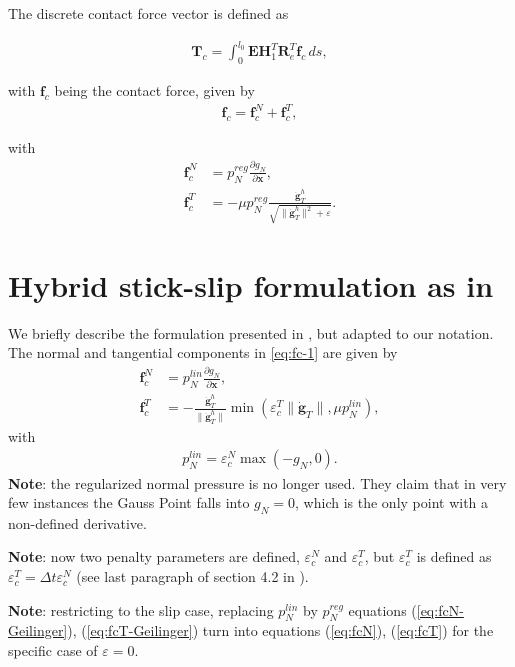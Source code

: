 \documentclass[3p]{elsarticle}
\newcommand{\vect}[1]{\boldsymbol{#1}}
\begin{document}
The discrete contact force vector is defined as

\begin{align}
	\vect{T}_c = \int_0^{l_0}\vect{E}\vect{H}^T_1\vect{R}_e^T\vect{f}_c\,ds,\label{eq:Tc}
\end{align}


\noindent  with $\vect{f}_c$ being the contact force, given by
\begin{align}
	\vect{f}_c = \vect{f}_c^N + \vect{f}_c^T\label{eq:fc-1},
\end{align}

\noindent with
\begin{align}
	\vect{f}_c^N &= p_N^{reg}\frac{\partial g_N}{\partial\vect{x}},\label{eq:fcN}\\
	\vect{f}_c^T&=-\mu p_N^{reg}\frac{\dot{\vect{g}}_T^h}{\sqrt{\|\dot{\vect{g}}_T^h\|^2+\varepsilon}}.\label{eq:fcT}
\end{align}


\section{Hybrid stick-slip formulation as in \cite{Geilinger2020}}
We briefly describe the formulation presented in \cite{Geilinger2020}, but adapted to our notation. The normal and tangential components in \ref{eq:fc-1} are given by 
\begin{align}
	\vect{f}_c^N &= p_N^{lin}\frac{\partial g_N}{\partial\vect{x}},\label{eq:fcN-Geilinger}\\
	\vect{f}_c^T&=- \frac{\dot{\vect{g}}_T^h}{\|\dot{\vect{g}}_T^h\|}\min\left(\varepsilon_c^T\|\dot{\vect{g}}_T\|,\mu p_N^{lin}\right),\label{eq:fcT-Geilinger}
\end{align}
\noindent with
\begin{align}
	p_N^{lin} = \varepsilon_c^N\max (-g_N,0).
\end{align}
\noindent \textbf{Note}:  the regularized normal pressure is no longer used. They claim that in very few instances the Gauss Point falls into $g_N=0$, which is the only point with a non-defined derivative. 


\noindent \textbf{Note}: now two penalty parameters are defined, $\varepsilon_c^N$ and $\varepsilon_c^T$, but $\varepsilon_c^T$ is defined as $\varepsilon_c^T = \Delta t \varepsilon_c^N$ (see last paragraph of section 4.2 in \cite{Geilinger2020}). 

\noindent \textbf{Note}: restricting to the slip case, replacing $p_N^{lin}$ by $p_N^{reg}$ equations (\ref{eq:fcN-Geilinger}), (\ref{eq:fcT-Geilinger}) turn into equations (\ref{eq:fcN}), (\ref{eq:fcT}) for the specific case of $\varepsilon=0$.
\end{document}
